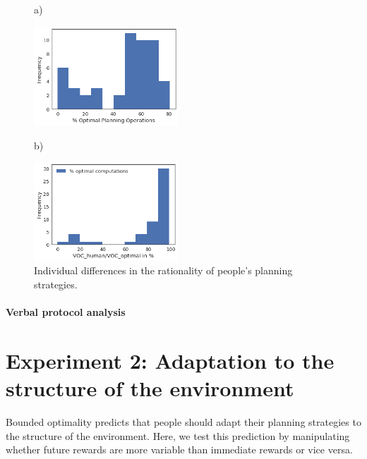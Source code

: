\begin{figure}
a)

\includegraphics[width=0.48\textwidth]{figures/optimal-planning-operations.png}

b)

\includegraphics[width=0.48\textwidth]{figures/VOC-ratio.png}
\caption{Individual differences in the rationality of people's planning strategies.}
\label{fig:individual-differences}
\end{figure}


\paragraph{Verbal protocol analysis}

\section{Experiment 2: Adaptation to the structure of the environment}

Bounded optimality predicts that people should adapt their planning strategies to the structure of the environment. Here, we test this prediction by manipulating whether future rewards are more variable than immediate rewards or vice versa.

